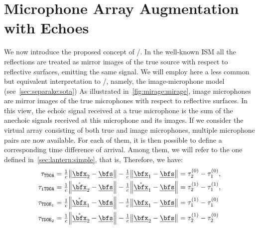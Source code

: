 \section{Microphone Array Augmentation with Echoes}\label{sec:mirage:mirage}
We now introduce the proposed concept of \MIRAGEdef/.
In the well-known \acf{ISM} all the reflections are treated as mirror images of the true source with respect to reflective surfaces, emitting the same signal.
We will employ here a less common but equivalent interpretation to \ISM/, namely, the image-microphone model (see~\cref{sec:separake:sota})
As illustrated in~\cref{fig:mirage:mirage}, image microphones are mirror images of the true microphones with respect to reflective surfaces.
In this view, the echoic signal received at a true microphone is the sum of the anechoic signals received at this microphone and its images.
If we consider the virtual array consisting of both true and image microphones, multiple microphone pairs are now available.
For each of them, it is then possible to define a corresponding time difference of arrival.
Among them, we will refer to the one defined in~\cref{sec:lantern:simple}, that is,
Therefore, we have:
\begin{equation}
    \begin{aligned}
        \tau_\mathtt{TDOA}  &= \tfrac{1}{c} \norm{\positionMicrophone_2 - \positionSource} - \tfrac{1}{c} \norm{\positionMicrophone_1 - \positionSource} = \tau_2^{(0)} - \tau_1^{(0)},\\
        \tau_\mathtt{iTDOA} &= \tfrac{1}{c} \norm{\mathring{\positionMicrophone}_2 - \positionSource} - \tfrac{1}{c} \norm{\mathring{\positionMicrophone}_1 - \positionSource} = \tau_2^{(1)} - \tau_1^{(1)},\\
        \tau_{\mathtt{TDOE}_1}  &= \tfrac{1}{c} \norm{\mathring{\positionMicrophone}_1 - \positionSource} - \tfrac{1}{c} \norm{\positionMicrophone_1 - \positionSource} = \tau_1^{(1)} - \tau_1^{(0)}\\
        \tau_{\mathtt{TDOE}_2}  &= \tfrac{1}{c} \norm{\mathring{\positionMicrophone}_2 - \positionSource} - \tfrac{1}{c} \norm{\positionMicrophone_2 - \positionSource} = \tau_2^{(1)} - \tau_2^{(0)}
    \end{aligned}
\end{equation}
